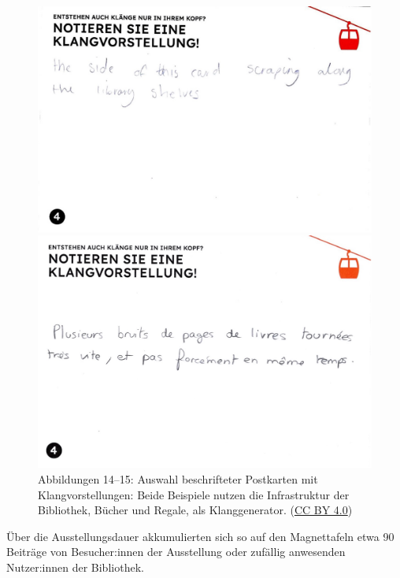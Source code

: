 \documentclass[a4paper,
fontsize=11pt,
oneside,
numbers=noperiodatend,
parskip=half-,
bibliography=totoc,
final
]{scrartcl}
\begin{document}
\begin{figure}[h]
    \centering
    \begin{minipage}[b]{0.45\textwidth}
        \centering
        \includegraphics[width=\textwidth]{img/Abb14.jpg}
    \end{minipage}
    \begin{minipage}[b]{0.45\textwidth}
        \centering
        \includegraphics[width=\textwidth]{img/Abb15.jpg}
    \end{minipage}
    \caption{Abbildungen 14--15: Auswahl beschrifteter Postkarten mit Klangvorstellungen: Beide Beispiele nutzen die Infrastruktur der Bibliothek, Bücher und Regale, als Klanggenerator. (\href{https://creativecommons.org/licenses/by/4.0/}{CC BY 4.0})}
\end{figure}


Über die Ausstellungsdauer akkumulierten sich so auf den Magnettafeln
etwa 90 Beiträge von Besucher:innen der Ausstellung oder zufällig
anwesenden Nutzer:innen der Bibliothek.
\end{document}
